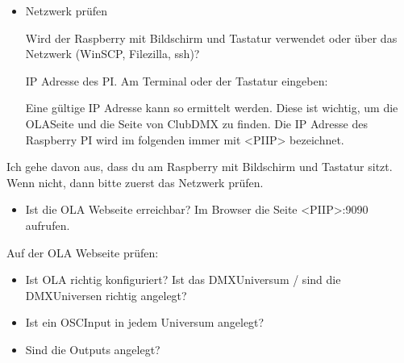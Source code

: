 \documentclass[letterpaper,10pt,ngerman]{sphinxmanual}
\begin{document}
\begin{itemize}
\item {} 
Netzwerk prüfen

Wird der Raspberry mit Bildschirm und Tastatur verwendet oder über das
Netzwerk (WinSCP, Filezilla, ssh)?

IP Adresse des PI. Am Terminal oder der Tastatur eingeben:


Eine gültige IP Adresse kann so ermittelt werden. Diese ist wichtig, um
die OLA\sphinxhyphen{}Seite und die Seite von ClubDMX zu finden. Die IP Adresse des Raspberry PI
wird im folgenden immer mit \textless{}PI\sphinxhyphen{}IP\textgreater{} bezeichnet.

\end{itemize}


Ich gehe davon aus, dass du am Raspberry mit Bildschirm und Tastatur sitzt.
Wenn nicht, dann bitte zuerst das Netzwerk prüfen.
\begin{itemize}
\item {} 
Ist die OLA Webseite erreichbar?
Im Browser die Seite \textless{}PI\sphinxhyphen{}IP\textgreater{}:9090 aufrufen.

\end{itemize}

Auf der OLA Webseite prüfen:
\begin{itemize}
\item {} 
Ist OLA richtig konfiguriert?
Ist das DMX\sphinxhyphen{}Universum / sind die DMX\sphinxhyphen{}Universen richtig angelegt?

\item {} 
Ist ein OSC\sphinxhyphen{}Input in jedem Universum angelegt?

\item {} 
Sind die Outputs angelegt?

\end{itemize}
\end{document}
